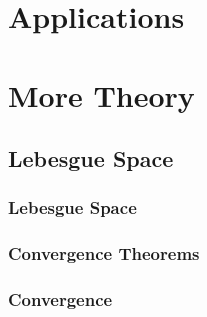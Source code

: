 \documentclass[a4paper]{book}
\theoremstyle{definition}
\begin{document}
\part{Applications}
%
\part{More Theory}
\chapter{Lebesgue Space}
\section{Lebesgue Space}

\section{Convergence Theorems}

\section{Convergence}

\end{document}
